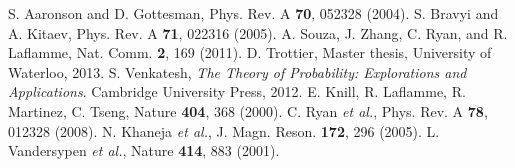 \documentclass[prl,twocolumn,showpacs]{revtex4-1}
\begin{document}
\begin{thebibliography}{99}
 S. Aaronson and D. Gottesman, Phys. Rev. A \textbf{70}, 052328 (2004).
 S. Bravyi and A. Kitaev, Phys. Rev. A \textbf{71}, 022316 (2005).
 A. Souza, J. Zhang, C. Ryan, and R. Laflamme, Nat. Comm. \textbf{2}, 169 (2011).
 D. Trottier, Master thesis, University of Waterloo, 2013.
 S. Venkatesh, \emph{The Theory of Probability: Explorations and Applications}. Cambridge University Press, 2012.
 E. Knill, R. Laflamme, R. Martinez, C. Tseng, Nature \textbf{404}, 368 (2000).
 C. Ryan \emph{et al.}, Phys. Rev. A \textbf{78}, 012328 (2008).
 N. Khaneja \emph{et al.}, J. Magn. Reson. \textbf{172}, 296 (2005).
 L. Vandersypen \emph{et al.}, Nature \textbf{414}, 883 (2001).
\end{thebibliography}
\end{document}

